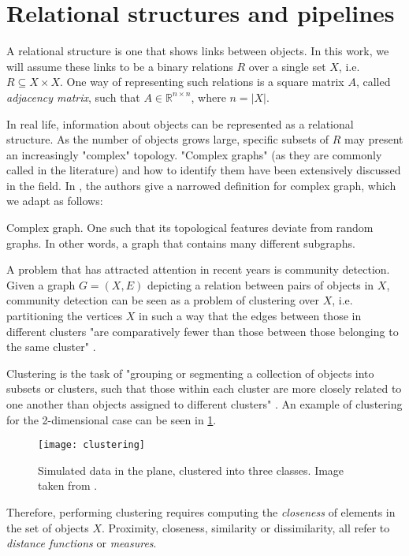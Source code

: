 \documentclass[../main.tex]{subfiles}
\begin{document}
\section{Relational structures and pipelines}\label{general_pipeline}
A relational structure is one that shows links between objects. In this work, we will assume these links to be a binary relations $R$ over a single set $X$, i.e. $R \subseteq X \times X$. One way of representing such relations is a square matrix $A$, called \emph{adjacency matrix}, such that $A \in \mathbb{R}^{n \times n}$, where $n =\left\vert{X}\right\vert$.
\par In real life, information about objects can be represented as a relational structure. As the number of objects grows large, specific subsets of $R$ may present an increasingly "complex" topology. "Complex graphs" (as they are commonly called in the literature) and how to identify them have been extensively discussed in the field. In \cite{Kim2008}, the authors give a narrowed definition for complex graph, which we adapt as follows:
\theoremstyle{definition}
\begin{definition}{Complex graph}. One such that its topological features deviate from random graphs. In other words, a graph that contains many different subgraphs.
\end{definition}
\par A problem that has attracted attention in recent years is community detection. Given a graph $G = (X, E)$ depicting a relation between pairs of objects in $X$, community detection can be seen as a problem of clustering over $X$, i.e. partitioning the vertices $X$ in such a way that the edges between those in different clusters "are comparatively fewer than those between those belonging to the same cluster" \cite{Fortunato2010}. 
\par Clustering is the task of "grouping or segmenting a collection of objects into subsets or clusters, such that those within each cluster are more closely related to one another than objects assigned to different clusters" \cite{hastie2008}. An example of clustering for the 2-dimensional case can be seen in \ref{clustering}.
\begin{figure}[ht]
\centering
\texttt{[image: clustering]}
\caption{Simulated data in the plane, clustered into three classes. Image taken from \cite{hastie2008}.}
\label{clustering}
\end{figure}
\par Therefore, performing clustering requires computing the \emph{closeness} of elements in the set of objects $X$. Proximity, closeness, similarity or dissimilarity, all refer to \emph{distance functions} or \emph{measures}. 
\end{document}
